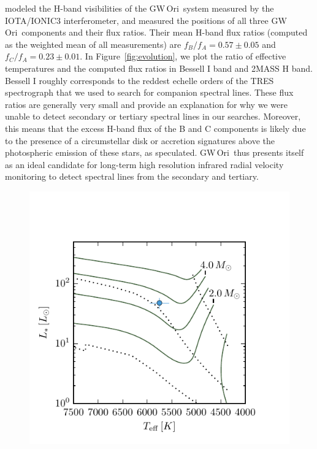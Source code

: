 \documentclass[twocolumn]{aastex61}
\newcommand{\gw}{GW\,Ori}
\begin{document}
\citet{berger11} modeled the H-band visibilities of the \gw\ system measured by the IOTA/IONIC3 interferometer, and measured the positions of all three \gw\ components and their flux ratios. Their mean H-band flux ratios (computed as the weighted mean of all measurements) are $f_B/f_A = 0.57 \pm 0.05$ and $f_C/f_A = 0.23 \pm 0.01$. In Figure~\ref{fig:evolution}, we plot the ratio of effective temperatures and the computed flux ratios in Bessell I band and 2MASS H band. Bessell I roughly corresponds to the reddest echelle orders of the TRES spectrograph that we used to search for companion spectral lines. These flux ratios are generally very small and provide an explanation for why we were unable to detect secondary or tertiary spectral lines in our searches. Moreover, this means that the excess H-band flux of the B and C components is likely due to the presence of a circumstellar disk or accretion signatures above the photospheric emission of these stars, as \citet{berger11} speculated. \gw\ thus presents itself as an ideal candidate for long-term high resolution infrared radial velocity monitoring to detect spectral lines from the secondary and tertiary.


\begin{figure}[htb]
\begin{center}
  \includegraphics{tracks.pdf}
  \end{center}
\end{figure}
\end{document}
